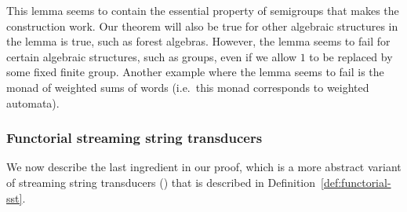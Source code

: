 This lemma seems to contain the essential property of semigroups that makes the construction work. Our theorem will also be true for other algebraic structures in the lemma is true, such as forest algebras. However, the lemma seems to fail for certain algebraic structures, such as groups, even if we allow $1$ to be replaced by some fixed finite group. Another example where the lemma seems to fail is the monad of weighted sums of words (i.e.~this monad corresponds to weighted automata).

\subsubsection{Functorial streaming string transducers}
\label{sec:functorial-sst}
We now describe the last ingredient in our proof, which is a more abstract variant  of streaming string transducers (\sst) that is described in Definition~\ref{def:functorial-sst}. 


